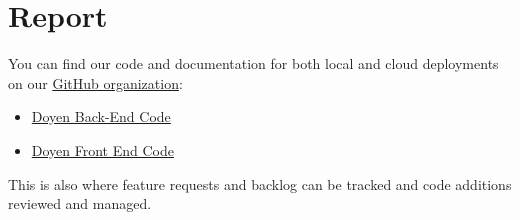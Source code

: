 \documentclass[11pt,twoside]{report} %
\begin{document}

\normalfont

\chapter{Report}

You can find our code and documentation for both local and cloud deployments on our \href{https://github.com/DoyenTeam}{GitHub organization}:
\begin{itemize}
    \item \href{https://github.com/DoyenTeam/doyen}{Doyen Back-End Code}
    \item \href{https://github.com/DoyenTeam/doyenclient}{Doyen Front End Code}
\end{itemize}
This is also where feature requests and backlog can be tracked and code additions reviewed and managed.

 









\vfill
\pagebreak


\begin{appendices}





\end{appendices}
\end{document}
